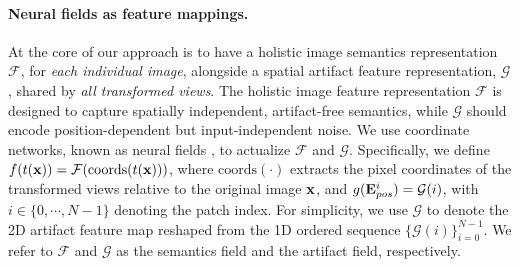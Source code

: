 \paragraph{Neural fields as feature mappings.} At the core of our approach is to have a holistic image semantics representation $\mathcal{F}$, for \textit{each individual image}, alongside a spatial artifact feature representation, $\mathcal{G}$, shared by \textit{all transformed views}. The holistic image feature representation $\mathcal{F}$ is designed to capture spatially independent, artifact-free semantics, while $\mathcal{G}$ should encode position-dependent but input-independent noise. We use coordinate networks, known as neural fields \cite{tancik2020fourfeat,muller2022instant,shen2023distilled,kobayashi2022decomposing,kerr2023lerf,yang2023emernerf}, to actualize $\mathcal{F}$ and $\mathcal{G}$. Specifically, we define $f(t(\vb{x}))=\mathcal{F}(\mathrm{coords}(t(\vb{x})))$, where $\mathrm{coords}(\cdot)$ extracts the pixel coordinates of the transformed views relative to the original image $\vb{x}$, and $g(\vb{E}^{i}_{pos})=\mathcal{G}(i)$, with $i \in \{0, \cdots, N-1\}$ denoting the patch index. For simplicity, we use $\mathcal{G}$ to denote the 2D artifact feature map reshaped from the 1D ordered sequence $\{\mathcal{G}(i)\}_{i=0}^{N-1}$. We refer to $\mathcal{F}$ and $\mathcal{G}$ as the semantics field and the artifact field, respectively.

